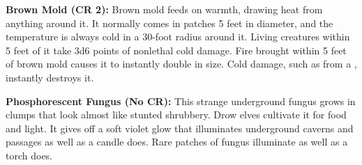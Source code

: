 \textbf{Brown Mold (CR 2):} Brown mold feeds on warmth, drawing heat from anything 
around it. It normally comes in patches 5 feet in diameter, and the temperature 
is always cold in a 30-foot radius around it. Living creatures within 5 feet of 
it take 3d6 points of nonlethal cold damage. Fire brought within 5 feet of brown 
mold causes it to instantly double in size. Cold damage, such as from a
, instantly destroys it.

\textbf{Phosphorescent Fungus (No CR):} This strange underground fungus grows in 
clumps that look almost like stunted shrubbery. Drow elves cultivate it for food 
and light. It gives off a soft violet glow that illuminates underground caverns 
and passages as well as a candle does. Rare patches of fungus illuminate as well 
as a torch does.